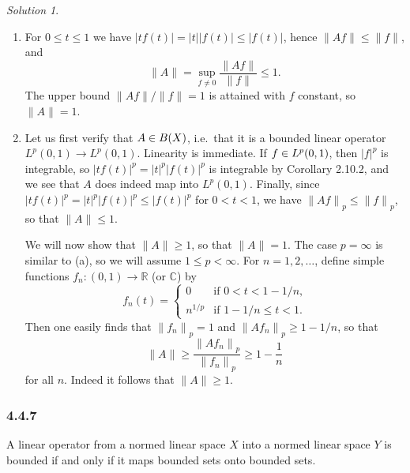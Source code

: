 \documentclass{report}
\newcommand{\bb}[1]{\mathbb{#1}}
\newcommand{\norm}[1]{{\lVert #1 \rVert}}
\let\sc\relax
\newcommand{\sc}[1]{\mathscr{#1}}
\theoremstyle{remark}
\newtheorem*{solution}{Solution}
\begin{document}
\begin{solution}
  \leavevmode
  \begin{enumerate}[label=(\alph*)]
    \item For $0 \le t \le 1$ we have $|tf(t)| = |t| |f(t)| \le |f(t)|$, hence $\norm{Af} \le \norm f$, and
      \begin{equation*}
        \norm A = \sup_{f \ne 0} \frac{\norm{Af}}{\norm f} \le 1.
      \end{equation*}
      The upper bound $\norm{Af} / \norm f = 1$ is attained with $f$ constant, so $\norm A = 1$.

    \item Let us first verify that $A \in \sc B(X)$, i.e.\ that it is a bounded linear operator $L^p(0,1) \to L^p(0,1)$. Linearity is immediate. If $f \in \sc L^p(0,1)$, then $|f|^p$ is integrable, so $|t f(t)|^p = |t|^p |f(t)|^p$ is integrable by Corollary 2.10.2, and we see that $A$ does indeed map into $L^p(0,1)$. Finally, since $|t f(t)|^p = |t|^p |f(t)|^p \le |f(t)|^p$ for $0 < t < 1$, we have $\norm{Af}_p \le \norm{f}_p$, so that $\norm A \le 1$.

      We will now show that $\norm A \ge 1$, so that $\norm A = 1$. The case $p = \infty$ is similar to (a), so we will assume $1 \le p < \infty$. For $n = 1,2,\dots$, define simple functions $f_n: (0,1) \to \bb R$ (or $\bb C$) by
      \begin{equation*}
        f_n(t) =
        \begin{cases}
          0 & \text{if $0 < t < 1 - 1/n$,} \\
          n^{1/p} & \text{if $1 - 1/n \le t < 1$.}
        \end{cases}
      \end{equation*}
      Then one easily finds that $\norm{f_n}_p = 1$ and $\norm{A f_n}_p \ge 1 - 1/n$, so that
      \begin{equation*}
        \norm A \ge \frac{\norm{A f_n}_p}{\norm{f_n}_p} \ge 1 - \frac{1}{n}
      \end{equation*}
      for all $n$. Indeed it follows that $\norm A \ge 1$.
  \end{enumerate}
\end{solution}

\subsubsection*{4.4.7}
A linear operator from a normed linear space $X$ into a normed linear space $Y$ is bounded if and only if it maps bounded sets onto bounded sets.
\end{document}
